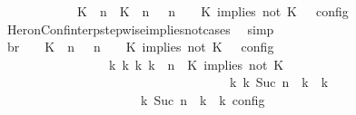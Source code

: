 \begin{isabellebody}
\ \ \ \ \ \ \ \ \ \ {\isasymunion}\ {\isasymlbrakk}\ {\isacharparenleft}{\isacharparenleft}K\ {\isasymUp}\ n{\isacharparenright}\ {\isacharhash}\ {\isacharparenleft}K\ {\isasymnot}{\isasymUp}\ n{\isacharparenright}\ {\isacharhash}\ {\isasymGamma}{\isacharparenright}{\isacharcomma}\ n\ {\isasymturnstile}\ {\isasymPsi}\ {\isasymtriangleright}\ {\isacharparenleft}{\isacharparenleft}K\ implies\ not\ K\ {\isacharhash}\ {\isasymPhi}{\isacharparenright}\ {\isasymrbrakk}\isactrlsub c\isactrlsub o\isactrlsub n\isactrlsub f\isactrlsub i\isactrlsub g{\isacartoucheclose}\isanewline
\ \ \ \ \ \ \ \ \isamarkupfalse%
\ HeronConf{\isacharunderscore}interp{\isacharunderscore}stepwise{\isacharunderscore}implies{\isacharunderscore}not{\isacharunderscore}cases\ \isamarkupfalse%
\ simp\isanewline
\ \ \ \ \ \ \isamarkupfalse%
\ \isamarkupfalse%
\ br{}{\isacharcolon}\ {\isacartoucheopen}{\isasymrho}\ {\isasymin}\ {\isasymlbrakk}\ {\isacharparenleft}{\isacharparenleft}K\ {\isasymnot}{\isasymUp}\ n{\isacharparenright}\ {\isacharhash}\ {\isasymGamma}{\isacharparenright}{\isacharcomma}\ n\ {\isasymturnstile}\ {\isasymPsi}\ {\isasymtriangleright}\ {\isacharparenleft}{\isacharparenleft}K\ implies\ not\ K\ {\isacharhash}\ {\isasymPhi}{\isacharparenright}\ {\isasymrbrakk}\isactrlsub c\isactrlsub o\isactrlsub n\isactrlsub f\isactrlsub i\isactrlsub g\isanewline
\ \ \ \ \ \ \ \ \ \ \ \ \ \ \ \ {\isasymLongrightarrow}\ {\isasymexists}{\isasymGamma}\isactrlsub k\ {\isasymPsi}\isactrlsub k\ {\isasymPhi}\isactrlsub k\ k{\isachardot}\ {\isacharparenleft}{\isacharparenleft}{\isasymGamma}{\isacharcomma}\ n\ {\isasymturnstile}\ {\isacharparenleft}{\isacharparenleft}K\ implies\ not\ K\ {\isacharhash}\ {\isasymPsi}{\isacharparenright}\ {\isasymtriangleright}\ {\isasymPhi}{\isacharparenright}\isanewline
\ \ \ \ \ \ \ \ \ \ \ \ \ \ \ \ \ \ \ \ \ \ \ \ \ \ \ \ \ \ \ \ \ \ \ \ {\isasymhookrightarrow}\isactrlbsup k\isactrlesup \ {\isacharparenleft}{\isasymGamma}\isactrlsub k{\isacharcomma}\ Suc\ n\ {\isasymturnstile}\ {\isasymPsi}\isactrlsub k\ {\isasymtriangleright}\ {\isasymPhi}\isactrlsub k{\isacharparenright}{\isacharparenright}\isanewline
\ \ \ \ \ \ \ \ \ \ \ \ \ \ \ \ \ \ {\isasymand}\ {\isasymrho}\ {\isasymin}\ {\isasymlbrakk}\ {\isasymGamma}\isactrlsub k{\isacharcomma}\ Suc\ n\ {\isasymturnstile}\ {\isasymPsi}\isactrlsub k\ {\isasymtriangleright}\ {\isasymPhi}\isactrlsub k\ {\isasymrbrakk}\isactrlsub c\isactrlsub o\isactrlsub n\isactrlsub f\isactrlsub i\isactrlsub g{\isacartoucheclose}\isanewline

\end{isabellebody}
